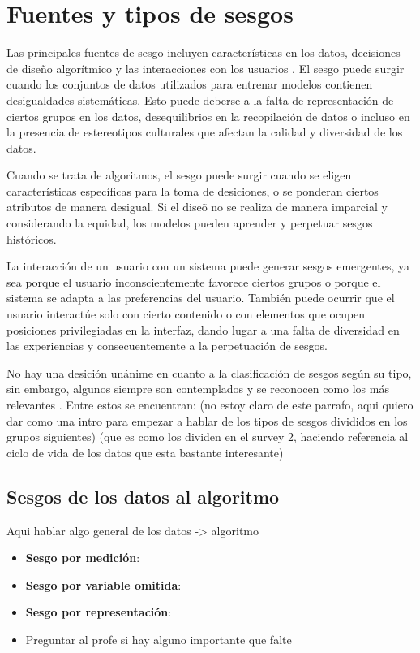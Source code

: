 \section{Fuentes y tipos de sesgos}

Las principales fuentes de sesgo incluyen caracter\'isticas en los datos, decisiones de dise\~no algor\'itmico y las interacciones 
con los usuarios \cite{resp_data}. El sesgo puede surgir cuando los conjuntos de datos utilizados para entrenar modelos contienen 
desigualdades sistem\'aticas. Esto puede deberse a la falta de representaci\'on de ciertos grupos en los datos, desequilibrios en 
la recopilaci\'on de datos o incluso en la presencia de estereotipos culturales que afectan la calidad y diversidad de los datos.

Cuando se trata de algoritmos, el sesgo puede surgir cuando se eligen caracter\'isticas espec\'ificas para la toma de desiciones, 
o se ponderan ciertos atributos  de manera desigual. Si el dise\~o no se realiza de manera imparcial y considerando la equidad, los 
modelos pueden aprender y perpetuar sesgos hist\'oricos.

La interacci\'on de un usuario con un sistema puede generar sesgos emergentes, ya sea porque el usuario inconscientemente 
favorece ciertos grupos o porque el sistema se adapta a las preferencias del usuario. Tambi\'en puede ocurrir que el usuario
interact\'ue solo con cierto contenido o con elementos que ocupen posiciones privilegiadas en la interfaz, dando lugar a una
falta de diversidad en las experiencias y consecuentemente a la perpetuaci\'on de sesgos.

No hay una desici\'on un\'anime en cuanto a la clasificaci\'on de sesgos seg\'un su tipo, sin embargo, 
algunos siempre son contemplados y se reconocen como los m\'as relevantes \cite{survey}. Entre estos se 
encuentran: (no estoy claro de este parrafo, aqui quiero dar como una intro para empezar a hablar de los tipos 
de sesgos divididos en los grupos siguientes)
(que es como los dividen en el survey 2, haciendo referencia al ciclo de vida de los datos que esta bastante interesante)

\subsection{Sesgos de los datos al algoritmo}
Aqui hablar algo general de los datos -> algoritmo

\begin{itemize}
    \item \textbf{Sesgo por medici\'on}:
    \item \textbf{Sesgo por variable omitida}:
    \item \textbf{Sesgo por representaci\'on}:
    \item Preguntar al profe si hay alguno importante que falte
\end{itemize}

